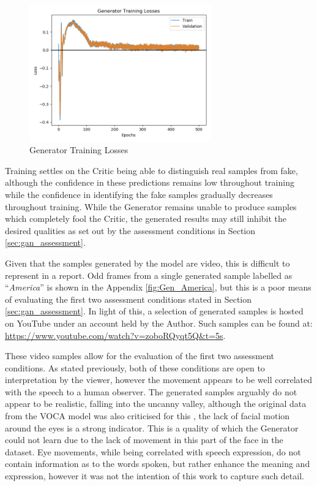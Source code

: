 \begin{figure}[h!]
    \centering
        \includegraphics[width=0.7\textwidth]{figures/gan/gen_train_losses.png}
    \caption{Generator Training Losses}\label{fig:gen_train_losses}
\end{figure} 

Training settles on the Critic being able to distinguish real samples from fake, although the confidence in these predictions remains low throughout training while the confidence in identifying the fake samples gradually decreases throughout training. 
While the Generator remains unable to produce samples which completely fool the Critic, the generated results may still inhibit the desired qualities as set out by the assessment conditions in Section \ref{sec:gan_assessment}.

Given that the samples generated by the model are video, this is difficult to represent in a report.
Odd frames from a single generated sample labelled as ``\textit{America}'' is shown in the Appendix \ref{fig:Gen_America}, but this is a poor means of evaluating the first two assessment conditions stated in Section \ref{sec:gan_assessment}.
In light of this, a selection of generated samples is hosted on YouTube under an account held by the Author. 
Such samples can be found at: \url{https://www.youtube.com/watch?v=zoboRQyqt5Q&t=5s}.

These video samples allow for the evaluation of the first two assessment conditions.
As stated previously, both of these conditions are open to interpretation by the viewer, however the movement appears to be well correlated with the speech to a human observer.
The generated samples arguably do not appear to be realistic, falling into the uncanny valley, although the original data from the VOCA model was also criticised for this \cite{Cudeiro2019}, the lack of facial motion around the eyes is a strong indicator.
This is a quality of which the Generator could not learn due to the lack of movement in this part of the face in the dataset.
Eye movements, while being correlated with speech expression, do not contain information as to the words spoken, but rather enhance the meaning and expression, however it was not the intention of this work to capture such detail.

